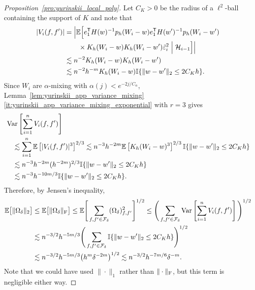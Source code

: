 \begin{proof}[Proposition~\ref{pro:yurinskii_local_poly}]
  Let $C_K>0$ be the radius of a $\ell^2$-ball
  containing the support of $K$
  and note that
  \begin{align*}
    \left|
    V_i(f,f')
    \right|
    &=
    \Big|
    \mathbb{E}\Big[
      e_1^{\mathsf{T}} H(w)^{-1}
      p_h(W_i-w)
      e_1^{\mathsf{T}} H(w')^{-1}
      p_h(W_i-w') \\
      &\qquad\times
      K_h(W_i-w)
      K_h(W_i-w')
      \tilde\varepsilon_i^2
      \Bigm| \mathcal{H}_{i-1}
    \Big]
    \Big| \\
    &\lesssim
    n^{-2}
    K_h(W_i-w)
    K_h(W_i-w') \\
    &\lesssim
    n^{-2}
    h^{-m}
    K_h(W_i-w)
    \mathbb{I}\{\|w-w'\|_2 \leq 2 C_K h\}.
  \end{align*}
  Since $W_i$ are $\alpha$-mixing
  with $\alpha(j) < e^{-2j / C_\alpha}$,
  Lemma~\ref{lem:yurinskii_app_variance_mixing}%
  \ref{it:yurinskii_app_variance_mixing_exponential}
  with $r=3$ gives
  \begin{align*}
    &\operatorname{Var}\left[
      \sum_{i=1}^n V_i(f,f')
    \right] \\
    &\quad\lesssim
    \sum_{i=1}^n
    \mathbb{E}\left[
      |V_i(f,f')|^3
    \right] ^{2/3}
    \lesssim
    n^{-3} h^{-2m}
    \mathbb{E}\left[
      K_h(W_i-w)^3
    \right] ^{2/3}
    \mathbb{I}\{\|w-w'\|_2 \leq 2 C_K h\} \\
    &\quad\lesssim
    n^{-3} h^{-2m}
    (h^{-2m})^{2/3}
    \mathbb{I}\{\|w-w'\|_2 \leq 2 C_K h\} \\
    &\quad\lesssim
    n^{-3} h^{-10m/3}
    \mathbb{I}\{\|w-w'\|_2 \leq 2 C_K h\}.
  \end{align*}
  Therefore, by Jensen's inequality,
  \begin{align*}
    \mathbb{E}\big[ \|\Omega_\delta\|_2 \big]
    &\leq
    \mathbb{E}\big[ \|\Omega_\delta\|_{\mathrm{F}} \big]
    \leq
    \mathbb{E}\Bigg[
      \sum_{f,f' \in \mathcal{F}_\delta}
      (\Omega_\delta)_{f,f'}^2
    \Bigg]^{1/2}
    \leq
    \Bigg(
      \sum_{f,f' \in \mathcal{F}_\delta}
      \operatorname{Var}\left[
        \sum_{i=1}^n V_i(f,f')
      \right]
    \Bigg)^{1/2} \\
    &\lesssim
    n^{-3/2} h^{-5m/3}
    \Bigg(
      \sum_{f,f' \in \mathcal{F}_\delta}
      \mathbb{I}\{\|w-w'\|_2 \leq 2 C_K h\}
    \Bigg)^{1/2} \\
    &\lesssim
    n^{-3/2} h^{-5m/3}
    \big(h^{m} \delta^{-2m} \big)^{1/2}
    \lesssim
    n^{-3/2}
    h^{-7m/6}
    \delta^{-m}.
  \end{align*}
  Note that we could have used
  $\|\cdot\|_1$ rather than $\|\cdot\|_{\mathrm{F}}$,
  but this term is negligible either way.


\end{proof}
